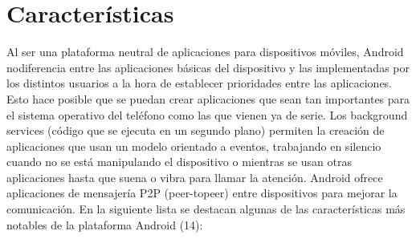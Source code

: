 \documentclass[letterpaper,12pt,openany,oneside]{book}
\begin{document}
\section{Características}

Al ser una plataforma neutral de aplicaciones para dispositivos móviles, Android nodiferencia entre las aplicaciones básicas del dispositivo y las implementadas por los distintos
usuarios a la hora de establecer prioridades entre las aplicaciones. Esto hace posible que se puedan crear aplicaciones que sean tan importantes para el sistema operativo del teléfono
como las que vienen ya de serie.
Los background services (código que se ejecuta en un segundo plano) permiten la creación de aplicaciones que usan un modelo orientado a eventos, trabajando en silencio
cuando no se está manipulando el dispositivo o mientras se usan otras aplicaciones hasta que suena o vibra para llamar la atención. Android ofrece aplicaciones de mensajería P2P (peer-topeer) entre dispositivos para mejorar la comunicación.
En la siguiente lista se destacan algunas de las características más notables de la
plataforma Android (14):
\end{document}
